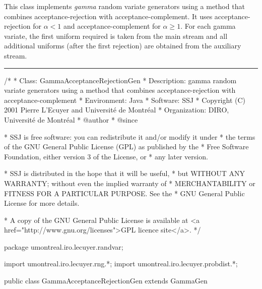 
This class implements {\em gamma\/} random variate generators using
a method that combines acceptance-rejection 
with acceptance-complement.
It uses acceptance-rejection for $\alpha<1$ and acceptance-complement
for $\alpha\ge 1$.
For each gamma variate, the first uniform required is taken from the 
main stream and all additional uniforms (after the first rejection)
are obtained from the auxiliary stream.

\bigskip\hrule

\begin{code}
\begin{hide}
/*
 * Class:        GammaAcceptanceRejectionGen
 * Description:  gamma random variate generators using a method that combines
                 acceptance-rejection with acceptance-complement
 * Environment:  Java
 * Software:     SSJ 
 * Copyright (C) 2001  Pierre L'Ecuyer and Université de Montréal
 * Organization: DIRO, Université de Montréal
 * @author       
 * @since

 * SSJ is free software: you can redistribute it and/or modify it under
 * the terms of the GNU General Public License (GPL) as published by the
 * Free Software Foundation, either version 3 of the License, or
 * any later version.

 * SSJ is distributed in the hope that it will be useful,
 * but WITHOUT ANY WARRANTY; without even the implied warranty of
 * MERCHANTABILITY or FITNESS FOR A PARTICULAR PURPOSE.  See the
 * GNU General Public License for more details.

 * A copy of the GNU General Public License is available at
   <a href="http://www.gnu.org/licenses">GPL licence site</a>.
 */
\end{hide}
package umontreal.iro.lecuyer.randvar;\begin{hide}
import umontreal.iro.lecuyer.rng.*;
import umontreal.iro.lecuyer.probdist.*;
\end{hide}

public class GammaAcceptanceRejectionGen extends GammaGen \begin{hide} {
    
}
\end{hide}
\end{code}
